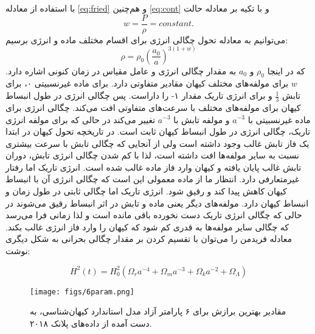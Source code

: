 با استفاده از معادله 
\ref{eq:fried}
و هم‌چنین
\ref{eq:cont}
و با تکیه بر معادله حالت 
 \begin{equation}
w = \frac{P}{\rho} = constant.
 \end{equation} 
 می‌توانیم به معادله تحول چگالی انرژی برای اقسام مختلف ماده و انرژی برسیم:
 \begin{equation}
\rho = \rho_0 (\frac{a_0}{a})^{3(1+w)}
\end{equation}  
که در اینجا 
$\rho_0$
و
$a_0$
به مقدار چگالی انرژی و عامل مقیاس در زمان کنونی اشاره دارد. $w$ برای مولفه‌های مختلف کیهان مقادیر متفاوتی دارد. برای ماده غیرنسبیتی ۰، برای تابش $\frac{1}{3}$ و برای انرژی تاریک مقدار ۱- را داراست. پس چگالی انرژی در طول انبساط کیهان برای مولفه‌های مختلف با سرعت‌های متفاوتی افت می‌کند. چگالی انرژی برای ماده غیرنسبیتی با
 $a^{-3}$
 و مولفه تابش با 
  $a^{-3}$
  تغییر می‌کند در حالی که برای مولفه انرژی تاریک، چگالی انرژی در طول انبساط کیهان ثابت است. در تاریخچه تحول کیهان در ابتدا یک فاز تابش غالب وجود داشته است ولی از آنجایی که چگالی تابش با سرعت بیشتری نسبت به سایر مولفه‌ها افت داشته است، لذا با کم شدن چگالی انرژی تابش، دوران تابش غالب پایان یافته و کیهان وارد فاز ماده غالب شده است. انرژی تاریک اما رفتار غیرمتعارفی دارد. انتظار ما از ماده معمولی این است که چگالی انرژی آن با انبساط کیهان کاهش پیدا کند و رقیق شود. انرژی تاریک اما چگالی ثابتی در طول زمان و انبساط کیهان دارد. مولفه‌های دیگر یعنی ماده و تابش در اثر انبساط رقیق می‌شوند در حالی که چگالی انرژی تاریک دست نخورده باقی مانده است و لذا زمانی فرا می‌رسد که چگالی سایر مولفه‌ها به قدری کم شود که کیهان را وارد فاز انرژی غالب بکند. معادله فریدمن را می‌توان با تقسیم کردن بر مقدار چگالی بحرانی به شکل دیگری نوشت:
\begin{flushleft}
	\begin{equation}
H^2(t) = H_0^2 ( \Omega_r a^{-4} + \Omega_m a^{-3}+ \Omega_k a^{-2}+ \Omega_{\Lambda} )
\end{equation}
\end{flushleft}

\begin{figure}[h!]
	\begin{center}
		\texttt{[image: figs/6param.png]}
	\end{center}
	\caption{ مقادیر بهترین برازش برای ۶ پارامتر آزاد مدل استاندارد کیهان‌شناسی، به دست آمده از داد‌ه‌های پلانک ۲۰۱۸.
	\cite{akrami2018legacy}}
	\label{fig:6param}
\end{figure}
  

